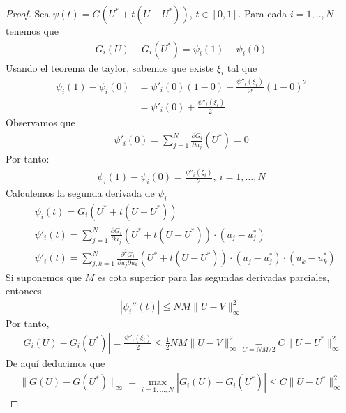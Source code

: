 \begin{proof}
    Sea $\psi(t) = G(U^* + t(U-U^*))$, $t \in [0,1]$. Para cada $i = 1,..,N$ tenemos que
    \begin{align*}
        G_i(U) - G_i(U^*) = \psi_i(1) - \psi_i(0)
    \end{align*}
    Usando el teorema de taylor, sabemos que existe $\xi_i$ tal que
    \begin{align*}
        \psi_i(1) - \psi_i(0) & = \psi'_i(0)(1-0) + \frac{\psi''_i(\xi_i)}{2!} (1-0)^2 \\
                              & = \psi'_i(0) + \frac{\psi''_i(\xi_i)}{2!}
    \end{align*}
    Observamos que
    \begin{align*}
        \psi'_i(0) = \sum_{j=1}^{N} \frac{\partial G_i}{\partial u_j}(U^*) = 0
    \end{align*}
    Por tanto:
    \begin{align*}
        \psi_i(1) - \psi_i(0) = \frac{\psi''_i(\xi_i)}{2}, \ i = 1,\ldots,N
    \end{align*}
    Calculemos la segunda derivada de $\psi_i$
    \begin{align*}
         & \psi_i(t) = G_i(U^* + t(U-U^*))                                                                                                       \\
         & \psi'_i(t) = \sum_{j=1}^{N} \frac{\partial G_i}{\partial u_j}(U^* + t(U-U^*)) \cdot (u_j - u_j^*)                                     \\
         & \psi'_i(t) = \sum_{j,k=1}^{N} \frac{\partial^2 G_i}{\partial u_j\partial u_k}(U^* + t(U-U^*)) \cdot (u_j - u_j^*) \cdot (u_k - u_k^*)
    \end{align*}
    Si suponemos que $M$ es cota superior para las segundas derivadas parciales, entonces
    \begin{align*}
        |\psi_i''(t)| \leq N M \|U - V\|_{\infty}^2
    \end{align*}
    Por tanto,
    \begin{align*}
        |G_i(U) - G_i(U^*)| = \frac{\psi''_i(\xi_i)}{2} \leq \frac{1}{2} NM \|U - V\|_{\infty}^2 \underset{C = NM/2}{=} C\|U-U^*\|_{\infty}^2
    \end{align*}
    De aquí deducimos que
    \begin{align*}
        \|G(U) - G(U^*)\|_{\infty} = \max_{i = 1,\ldots,N} |G_i(U) - G_i(U^*)| \leq C \|U-U^*\|_{\infty}^2
    \end{align*}
\end{proof}

